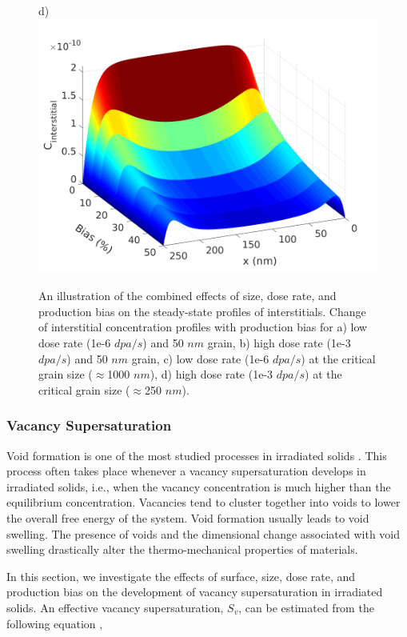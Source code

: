 \documentclass[utf8]{frontiersSCNS} %
\begin{document}
\begin{figure}[htb!]
        \qquad
        d)\includegraphics[scale=0.3]{Fig6_d}
        \caption{An illustration of the combined effects of size, dose rate, and production bias on the steady-state profiles of interstitials. Change of interstitial concentration profiles with production bias for a) low dose rate (1e-6 $dpa/s$) and 50 $nm$ grain, b) high dose rate (1e-3 $dpa/s$) and 50 $nm$ grain, c) low dose rate (1e-6 $dpa/s$) at the critical grain size ($\approx$1000 $nm$), d) high dose rate (1e-3 $dpa/s$) at the critical grain size ($\approx$250 $nm$).}
        \label{figure:3D_concentrations_neutron_1e-6}
    \end{figure}

\subsubsection{Vacancy Supersaturation}

    Void formation is one of the most studied processes in irradiated solids \cite{was2017,noble2020,ghoniem2001,krishnanOct1980,gao2018}. This process often takes place whenever a vacancy supersaturation develops in irradiated solids, i.e., when the vacancy concentration is much higher than the equilibrium concentration. Vacancies tend to cluster together into voids to lower the overall free energy of the system. Void formation usually leads to void swelling. The presence of voids and the dimensional change associated with void swelling drastically alter the thermo-mechanical properties of materials.  
    
    In this section, we investigate the effects of surface, size, dose rate, and production bias on the development of vacancy supersaturation in irradiated solids. An effective vacancy supersaturation, $S_v$, can be estimated from the following equation \citep{was2017},
\end{document}

